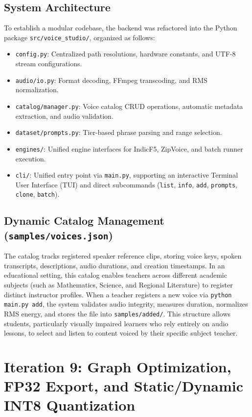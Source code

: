 \subsection{System Architecture}
To establish a modular codebase, the backend was refactored into the Python package \texttt{src/voice\_studio/}, organized as follows:
\begin{itemize}
    \item \texttt{config.py}: Centralized path resolutions, hardware constants, and UTF-8 stream configurations.
    \item \texttt{audio/io.py}: Format decoding, FFmpeg transcoding, and RMS normalization.
    \item \texttt{catalog/manager.py}: Voice catalog CRUD operations, automatic metadata extraction, and audio validation.
    \item \texttt{dataset/prompts.py}: Tier-based phrase parsing and range selection.
    \item \texttt{engines/}: Unified engine interfaces for IndicF5, ZipVoice, and batch runner execution.
    \item \texttt{cli/}: Unified entry point via \texttt{main.py}, supporting an interactive Terminal User Interface (TUI) and direct subcommands (\texttt{list}, \texttt{info}, \texttt{add}, \texttt{prompts}, \texttt{clone}, \texttt{batch}).
\end{itemize}

\subsection{Dynamic Catalog Management (\texttt{samples/voices.json})}
The catalog tracks registered speaker reference clips, storing voice keys, spoken transcripts, descriptions, audio durations, and creation timestamps. In an educational setting, this catalog enables teachers across different academic subjects (such as Mathematics, Science, and Regional Literature) to register distinct instructor profiles. When a teacher registers a new voice via \texttt{python main.py add}, the system validates audio integrity, measures duration, normalizes RMS energy, and stores the file into \texttt{samples/added/}. This structure allows students, particularly visually impaired learners who rely entirely on audio lessons, to select and listen to content voiced by their specific subject teacher.

\section[Iteration 9: Graph Optimization and INT8 Quantization]{Iteration 9: Graph Optimization, FP32 Export, and Static/Dynamic INT8 Quantization}
